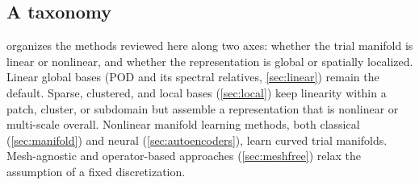 \subsection{A taxonomy}

 organizes the methods reviewed here along two axes: whether
the trial manifold is linear or nonlinear, and whether the representation is
global or spatially localized. Linear global bases (POD and its spectral
relatives, \cref{sec:linear}) remain the default. Sparse, clustered, and local
bases (\cref{sec:local}) keep linearity within a patch, cluster, or subdomain
but assemble a representation that is nonlinear or multi-scale overall.
Nonlinear manifold learning methods, both classical (\cref{sec:manifold}) and
neural (\cref{sec:autoencoders}), learn curved trial manifolds. Mesh-agnostic
and operator-based approaches (\cref{sec:meshfree}) relax the assumption of a
fixed discretization.


